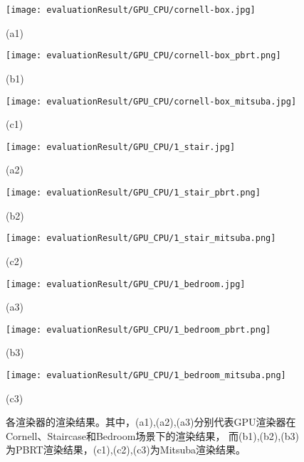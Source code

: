 \begin{figure}                 %
    \begin{minipage}{0.3\textwidth}  %
      \centerline{\texttt{[image: evaluationResult/GPU\_CPU/cornell-box.jpg]}}
      \centerline{(a1)}
    \end{minipage}
    \hfill
    \begin{minipage}{0.3\textwidth}  %
      \centerline{\texttt{[image: evaluationResult/GPU\_CPU/cornell-box\_pbrt.png]}}
      \centerline{(b1)}
    \end{minipage}    
    \hfill
    \begin{minipage}{0.3\textwidth}  %
        \centerline{\texttt{[image: evaluationResult/GPU\_CPU/cornell-box\_mitsuba.jpg]}}
        \centerline{(c1)}
      \end{minipage}
    \vfill
    \begin{minipage}{0.3\textwidth}  %
        \centerline{\texttt{[image: evaluationResult/GPU\_CPU/1\_stair.jpg]}}
        \centerline{(a2)}
      \end{minipage}
      \hfill
      \begin{minipage}{0.3\textwidth}  %
        \centerline{\texttt{[image: evaluationResult/GPU\_CPU/1\_stair\_pbrt.png]}}
        \centerline{(b2)}
      \end{minipage}    
      \hfill
      \begin{minipage}{0.3\textwidth}  %
          \centerline{\texttt{[image: evaluationResult/GPU\_CPU/1\_stair\_mitsuba.png]}}
          \centerline{(c2)}
        \end{minipage}
      \vfill
    \begin{minipage}{0.3\textwidth}  %
    \centerline{\texttt{[image: evaluationResult/GPU\_CPU/1\_bedroom.jpg]}}
    \centerline{(a3)}
    \end{minipage}
    \hfill
    \begin{minipage}{0.3\textwidth}  %
    \centerline{\texttt{[image: evaluationResult/GPU\_CPU/1\_bedroom\_pbrt.png]}}
    \centerline{(b3)}
    \end{minipage}    
    \hfill
    \begin{minipage}{0.3\textwidth}  %
        \centerline{\texttt{[image: evaluationResult/GPU\_CPU/1\_bedroom\_mitsuba.png]}}
        \centerline{(c3)}
    \end{minipage}
    \vfill
    \caption{各渲染器的渲染结果。其中，(a1),(a2),(a3)分别代表GPU渲染器在Cornell、Staircase和Bedroom场景下的渲染结果，
    而(b1),(b2),(b3)为PBRT渲染结果，(c1),(c2),(c3)为Mitsuba渲染结果。}
    \label{fig:lab1image}
\end{figure}


